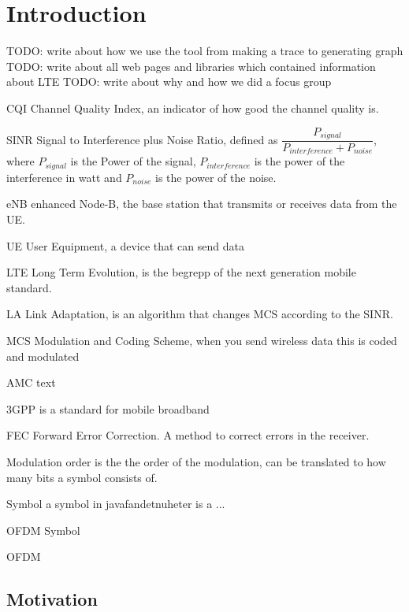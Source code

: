 \documentclass[cropmarks, frame, english]{idamasterthesis}
\author{Paul Nedstrand \& Razmus Lindgren}
\newcommand{\abbrlabel}[1]{\makebox[3cm][l]{\textbf{#1}\ \dotfill}}
\newenvironment{abbreviations}{\begin{list}{}{\renewcommand{\makelabel}{\abbrlabel}}}{\end{list}}
\begin{document}
\makeintropages


 
\chapter{Introduction}
TODO: write about how we use the tool from making a trace to generating graph
TODO: write about all web pages and libraries which contained information about LTE
TODO: write about why and how we did a focus group

\begin{abbreviations}
\item[CQI] Channel Quality Index, an indicator of how good the channel quality is.
\item[SINR] Signal to Interference plus Noise Ratio, defined as $\dfrac{P_{signal}}{P_{interference} + P_{noise}}$, where $P_{signal}$ is the Power of the signal, $P_{interference}$ is the power of the interference in watt and $P_{noise}$ is the power of the noise.
\item[eNB] enhanced Node-B, the base station that transmits or receives data from the UE.
\item[UE] User Equipment, a device that can send data
\item[LTE] Long Term Evolution, is the begrepp of the next generation mobile standard.
\item[LA] Link Adaptation, is an algorithm that changes MCS according to the SINR.
\item[MCS] Modulation and Coding Scheme, when you send wireless data this is coded and modulated
\item[AMC] text
\item[3GPP] is a standard for mobile broadband
\item[FEC] Forward Error Correction. A method to correct errors in the receiver.
\item[Modulation order] is the the order of the modulation, can be translated to how many bits a symbol consists of.
\item[Symbol] a symbol in javafandetnuheter is a ...
\item[OFDM Symbol]
\item[OFDM]




\end{abbreviations}


\section{Motivation}
\end{document}

